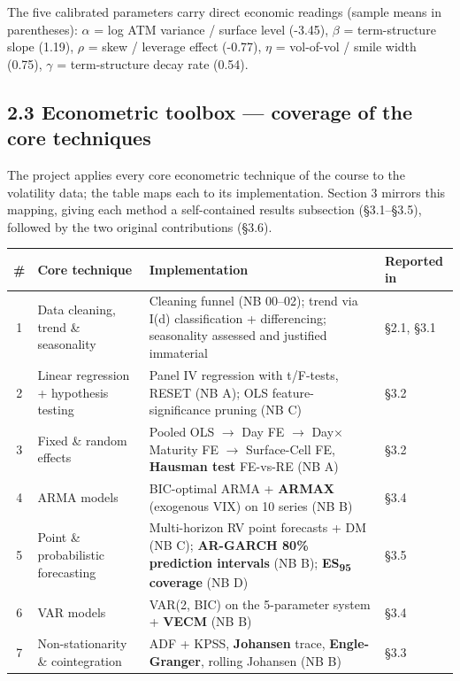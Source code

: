\documentclass[10pt,a4paper]{article}
\begin{document}
The five calibrated parameters carry direct economic readings (sample means in parentheses): \textbf{$\alpha$} = log ATM variance / surface level (-3.45), \textbf{$\beta$} = term-structure slope (1.19), \textbf{$\rho$} = skew / leverage effect (-0.77), \textbf{$\eta$} = vol-of-vol / smile width (0.75), \textbf{$\gamma$} = term-structure decay rate (0.54).

\subsection*{2.3 Econometric toolbox --- coverage of the core techniques}

The project applies every core econometric technique of the course to the volatility data; the table maps each to its implementation. Section 3 mirrors this mapping, giving each method a self-contained results subsection (\S{}3.1--\S{}3.5), followed by the two original contributions (\S{}3.6).

\begin{center}\footnotesize
\begin{tabularx}{\textwidth}{@{}c >{\raggedright\arraybackslash}p{3.0cm} X >{\raggedright\arraybackslash}p{1.6cm}@{}}
\toprule
\textbf{\#} & \textbf{Core technique} & \textbf{Implementation} & \textbf{Reported in} \\
\midrule
1 & Data cleaning, trend \& seasonality & Cleaning funnel (NB 00--02); trend via I(d) classification + differencing; seasonality assessed and justified immaterial & \S{}2.1, \S{}3.1 \\
2 & Linear regression + hypothesis testing & Panel IV regression with t/F-tests, RESET (NB A); OLS feature-significance pruning (NB C) & \S{}3.2 \\
3 & Fixed \& random effects & Pooled OLS $\rightarrow$ Day FE $\rightarrow$ Day$\times$Maturity FE $\rightarrow$ Surface-Cell FE, \textbf{Hausman test} FE-vs-RE (NB A) & \S{}3.2 \\
4 & ARMA models & BIC-optimal ARMA + \textbf{ARMAX} (exogenous VIX) on 10 series (NB B) & \S{}3.4 \\
5 & Point \& probabilistic forecasting & Multi-horizon RV point forecasts + DM (NB C); \textbf{AR-GARCH 80\% prediction intervals} (NB B); \textbf{ES\textsubscript{95} coverage} (NB D) & \S{}3.5 \\
6 & VAR models & VAR(2, BIC) on the 5-parameter system + \textbf{VECM} (NB B) & \S{}3.4 \\
7 & Non-stationarity \& cointegration & ADF + KPSS, \textbf{Johansen} trace, \textbf{Engle-Granger}, rolling Johansen (NB B) & \S{}3.3 \\
\bottomrule
\end{tabularx}
\end{center}
\end{document}

